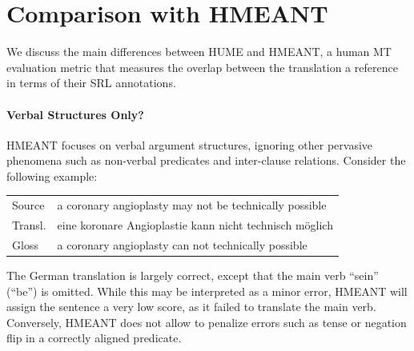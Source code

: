 \documentclass[11pt,letterpaper]{article}
\begin{document}
\section{Comparison with HMEANT}\label{sec:hmeant_comp}

We discuss the main differences between HUME and HMEANT,
a human MT evaluation metric that measures the overlap between the translation a reference
in terms of their SRL annotations.


\paragraph{Verbal Structures Only?}

HMEANT focuses on verbal argument structures, ignoring other pervasive phenomena such as non-verbal predicates and inter-clause relations. Consider the following example:

\vspace{-.3em}
\begin{center}
\begin{tabular}{lp{5.4cm}}
Source & \small a coronary angioplasty may not be technically possible \\
Transl.& \small eine koronare Angioplastie kann nicht technisch m{\"o}glich \\
Gloss & \small a coronary angioplasty can not technically possible \\
\end{tabular}
\end{center}
\vspace{-.5em}


The German translation 
is largely correct, except that the main verb ``sein'' (``be'') is omitted.
While this may be interpreted as a minor error, HMEANT will assign the
sentence a very low score, as it failed to translate the main verb.
%
Conversely, HMEANT does not allow to penalize errors such as tense or negation
flip in a correctly aligned predicate.
\end{document}
